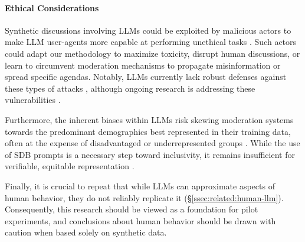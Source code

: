 %
\paragraph{Ethical Considerations} 
Synthetic discussions involving LLMs could be exploited by malicious actors to make LLM user-agents more capable at performing unethical tasks \cite{majumdar_2024_nefarious, MARULLI20245340}. Such actors could adapt our methodology to  maximize toxicity, disrupt human discussions, or learn to circumvent moderation mechanisms to propagate misinformation or spread specific agendas. Notably, LLMs currently lack robust defenses against these types of attacks \cite{li_2025_vulnerable}, although ongoing research is addressing these vulnerabilities \cite{wang_2025_risk}.

Furthermore, the inherent biases within LLMs risk skewing moderation systems towards the predominant demographics best represented in their training data, often at the expense of disadvantaged or underrepresented groups \cite{rossi_2024, anthis_2025, burton2024large}. While the use of SDB prompts is a necessary step toward inclusivity, it remains insufficient for verifiable, equitable representation \cite{rossi_2024}.


Finally, it is crucial to repeat that while LLMs can approximate aspects of human behavior, they do not reliably replicate it (\S\ref{ssec:related:human-llm}). Consequently, this research should be viewed as a foundation for pilot experiments, and conclusions about human behavior should be drawn with caution when based solely on synthetic data.